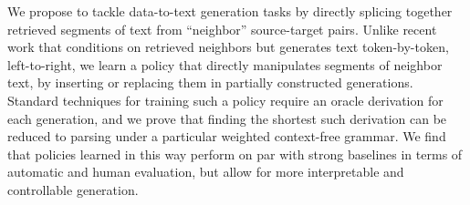We propose to tackle data-to-text generation tasks by directly splicing together retrieved segments of text from ``neighbor'' source-target pairs. Unlike recent work that conditions on retrieved neighbors but generates text token-by-token, left-to-right, we learn a policy that directly manipulates segments of neighbor text, by inserting or replacing them in partially constructed generations. Standard techniques for training such a policy require an oracle derivation for each generation, and we prove that finding the shortest such derivation can be reduced to parsing under a particular weighted context-free grammar. We find that policies learned in this way perform on par with strong baselines in terms of automatic and human evaluation, but allow for more interpretable and controllable generation.
